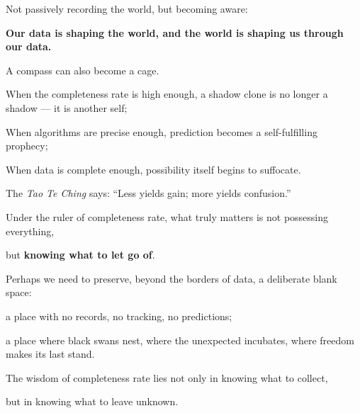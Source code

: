 Not passively recording the world, but becoming aware:

\textbf{Our data is shaping the world, and the world is shaping us through our data.}

\vspace{1em}

A compass can also become a cage.

When the completeness rate is high enough, a shadow clone is no longer a shadow --- it is another self;

When algorithms are precise enough, prediction becomes a self-fulfilling prophecy;

When data is complete enough, possibility itself begins to suffocate.

\vspace{1em}

The \emph{Tao Te Ching} says: ``Less yields gain; more yields confusion.''

Under the ruler of completeness rate, what truly matters is not possessing everything,

but \textbf{knowing what to let go of}.

Perhaps we need to preserve, beyond the borders of data, a deliberate blank space:

a place with no records, no tracking, no predictions;

a place where black swans nest, where the unexpected incubates, where freedom makes its last stand.

\begin{importantbox}
The wisdom of completeness rate lies not only in knowing what to collect,

but in knowing what to leave unknown.
\end{importantbox}
